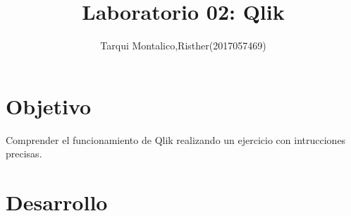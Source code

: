 \documentclass[preprint,12pt]{elsarticle}
\begin{document}
	
	\begin{frontmatter}

		\title{\huge  Laboratorio 02: Qlik	 }
		\author{	Tarqui Montalico,Risther(2017057469)}
		
		





\end{frontmatter}

\section{Objetivo}
	
	Comprender el funcionamiento de Qlik realizando un ejercicio con intrucciones precisas.


\section{Desarrollo}
\end{document}
